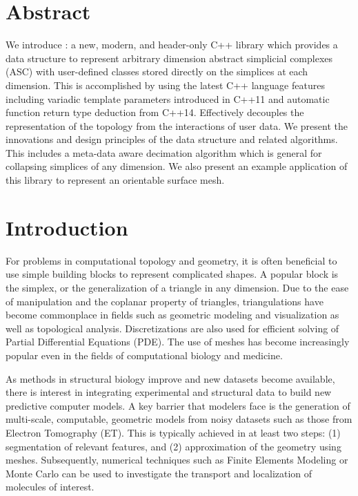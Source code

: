 
\section{Abstract}
We introduce \asc: a new, modern, and header-only C++ library which provides a data structure to represent arbitrary dimension abstract simplicial complexes (ASC) with user-defined classes stored directly on the simplices at each dimension.
This is accomplished by using the latest C++ language features including variadic template parameters introduced in C++11 and automatic function return type deduction from C++14.
Effectively \asc decouples the representation of the topology from the interactions of user data.
We present the innovations and design principles of the data structure and related algorithms.
This includes a meta-data aware decimation algorithm which is general for collapsing simplices of any dimension.
We also present an example application of this library to represent an orientable surface mesh.

\section{Introduction}\label{sec:intro}

\par For problems in computational topology and geometry, it is often beneficial to use simple building blocks to represent complicated shapes.
A popular block is the simplex, or the generalization of a triangle in any dimension.
Due to the ease of manipulation and the coplanar property of triangles, triangulations have become commonplace in fields such as geometric modeling and visualization as well as topological analysis.
Discretizations are also used for efficient solving of Partial Differential Equations (PDE).
The use of meshes has become increasingly popular even in the fields of computational biology and medicine\cite{Zhang2016}.

\par As methods in structural biology improve and new datasets become available, there is interest in integrating experimental and structural data to build new predictive computer models\cite{Roberts2014}.
A key barrier that modelers face is the generation of multi-scale, computable, geometric models from noisy datasets such as those from Electron Tomography (ET)\cite{Yu2008a}.
This is typically achieved in at least two steps: (1) segmentation of relevant features, and (2) approximation of the geometry using meshes.
Subsequently, numerical techniques such as Finite Elements Modeling or Monte Carlo can be used to investigate the transport and localization of molecules of interest.

